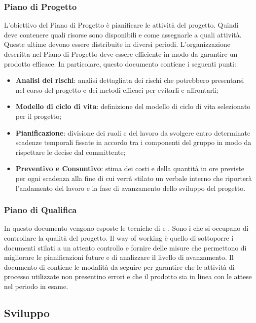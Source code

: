 \subsubsection{Piano di Progetto}
L'obiettivo del Piano di Progetto è pianificare le attività del progetto. Quindi deve contenere quali 
risorse sono disponibili e come assegnarle a quali attività. Queste ultime devono essere distribuite in diversi
periodi. L'organizzazione descritta nel Piano di Progetto deve essere efficiente in modo da garantire un
prodotto efficace. In particolare, questo documento contiene i seguenti punti:
\begin{itemize}
    \item \textbf{Analisi dei rischi}: analisi dettagliata dei rischi che potrebbero presentarsi nel corso del progetto e dei metodi efficaci per evitarli e affrontarli;
    \item \textbf{Modello di ciclo di vita}: definizione del modello di ciclo di vita selezionato per il progetto;
    \item \textbf{Pianificazione}: divisione dei ruoli e del lavoro da svolgere entro determinate scadenze temporali fissate in accordo tra i componenti del gruppo in modo da rispettare le  decise dal committente;
    \item \textbf{Preventivo e Consuntivo}: stima dei costi e della quantità in ore previste per ogni scadenza alla fine di cui verrà stilato un verbale interno che riporterà l'andamento del lavoro e la fase di avanzamento dello sviluppo del progetto.
\end{itemize}

\subsubsection{Piano di Qualifica}
In questo documento vengono esposte le tecniche di  e .
Sono i \roleVerifierP{} che si occupano di controllare la qualità del progetto. Il way of working
è quello di sottoporre i documenti stilati a un attento controllo e fornire delle misure che permettono di migliorare le pianificazioni future e di analizzare il livello di avanzamento. 
Il documento di \docNameVersionPdQ{} contiene le modalità da seguire per garantire che le attività di processo utilizzate non presentino
errori e che il prodotto sia in linea con le attese nel periodo in esame.


\subsection{Sviluppo}

